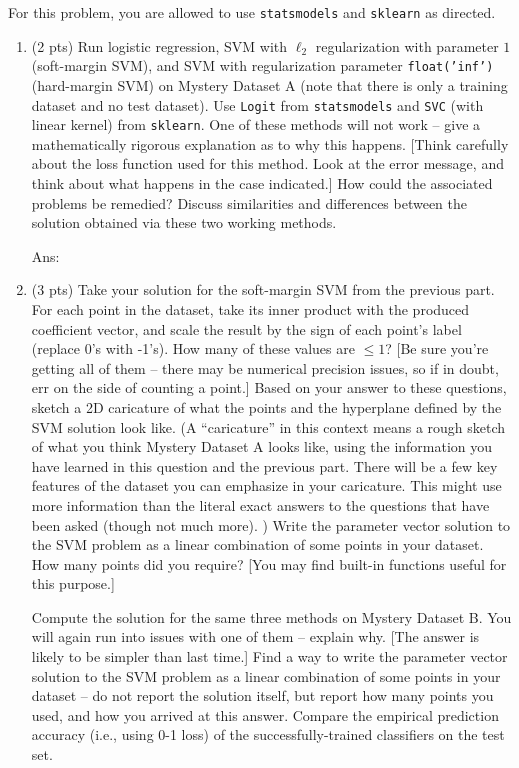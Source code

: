 \documentclass[10pt,letter,notitlepage]{article}
\newcommand{\ans}[1]{{\color{orange}\textsf{Ans}: #1}}
\newcounter{exercise}
\begin{document}
\begin{exercise}
For this problem, you are allowed to use \texttt{statsmodels} and \texttt{sklearn} as directed.
\begin{enumerate}
\item (2 pts) Run logistic regression, SVM with $\ell_2$ regularization with parameter $1$ (soft-margin SVM), and SVM with regularization parameter \texttt{float('inf')} (hard-margin SVM) on Mystery Dataset A (note that there is only a training dataset and no test dataset). Use \texttt{Logit} from \texttt{statsmodels} and \texttt{SVC} (with linear kernel) from \texttt{sklearn}.
One of these methods will not work -- give a mathematically rigorous explanation as to why this happens.
[Think carefully about the loss function used for this method. Look at the error message, and think about what happens in the case indicated.]
How could the associated problems be remedied?
Discuss similarities and differences between the solution obtained via these two working methods. 

\ans{} 

\item (3 pts) Take your solution for the soft-margin SVM from the previous part.
For each point in the dataset, take its inner product with the produced coefficient vector, and scale the result by the sign of each point's label (replace 0's with -1's). How many of these values are $\leq 1$? [Be sure you're getting all of them -- there may be numerical precision issues, so if in doubt, err on the side of counting a point.]
Based on your answer to these questions, sketch a 2D caricature of what the points and the hyperplane defined by the SVM solution look like.
    (A ``caricature'' in this context means a rough sketch of what you think Mystery Dataset A looks like, using the information you have learned in this question and the previous part. 
    There will be a few key features of the dataset you can emphasize in your caricature.
    This might use more information than the literal exact answers to the questions that have been asked (though not much more).
    ) 
Write the parameter vector solution to the SVM problem as a linear combination of some points in your dataset.
How many points did you require?
[You may find built-in functions useful for this purpose.]

Compute the solution for the same three methods on Mystery Dataset B. 
You will again run into issues with one of them -- explain why. [The answer is likely to be simpler than last time.]
Find a way to write the parameter vector solution to the SVM problem as a linear combination of some points in your dataset -- do not report the solution itself, but report how many points you used, and how you arrived at this answer.
Compare the empirical prediction accuracy (i.e., using 0-1 loss) of the successfully-trained classifiers on the test set. 


\end{enumerate}
\end{exercise}
\end{document}
